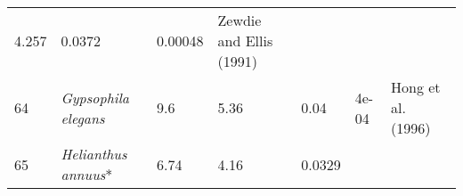 \documentclass[]{article}
\begin{document}
\begin{longtable}[]{@{}lllllll@{}}
\begin{minipage}[t]{0.08\columnwidth}
4.257\strut
\end{minipage} & \begin{minipage}[t]{0.08\columnwidth}\raggedright
0.0372\strut
\end{minipage} & \begin{minipage}[t]{0.08\columnwidth}\raggedright
0.00048\strut
\end{minipage} & \begin{minipage}[t]{0.23\columnwidth}\raggedright
Zewdie and Ellis (1991)\strut
\end{minipage}\tabularnewline
\begin{minipage}[t]{0.05\columnwidth}\raggedright
64\strut
\end{minipage} & \begin{minipage}[t]{0.23\columnwidth}\raggedright
\emph{Gypsophila elegans}\strut
\end{minipage} & \begin{minipage}[t]{0.05\columnwidth}\raggedright
9.6\strut
\end{minipage} & \begin{minipage}[t]{0.08\columnwidth}\raggedright
5.36\strut
\end{minipage} & \begin{minipage}[t]{0.08\columnwidth}\raggedright
0.04\strut
\end{minipage} & \begin{minipage}[t]{0.08\columnwidth}\raggedright
4e-04\strut
\end{minipage} & \begin{minipage}[t]{0.23\columnwidth}\raggedright
Hong et al. (1996)\strut
\end{minipage}\tabularnewline
\begin{minipage}[t]{0.05\columnwidth}\raggedright
65\strut
\end{minipage} & \begin{minipage}[t]{0.23\columnwidth}\raggedright
\emph{Helianthus annuus}*\strut
\end{minipage} & \begin{minipage}[t]{0.05\columnwidth}\raggedright
6.74\strut
\end{minipage} & \begin{minipage}[t]{0.08\columnwidth}\raggedright
4.16\strut
\end{minipage} & \begin{minipage}[t]{0.08\columnwidth}\raggedright
0.0329\strut
\end{minipage} & \begin{minipage}[t]{0.08\columnwidth}\raggedright

\end{minipage}
\end{longtable}
\end{document}

